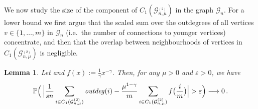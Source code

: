 \documentclass[12pt,a4paper]{article}
\numberwithin{equation}{section}
\newtheorem{lemma}[shared]{Lemma}
\begin{document}
We now study the size of the component 
of $C_1(\mathcal G_{n,\mu}^{_{(2)}})$ in the graph 
$\mathscr G_n$. For a lower bound we first argue that the scaled sum over the outdegrees of all vertices $v\in \{1,\ldots, m\}$ in $\mathscr G_n$ (i.e.\ the number of connections to younger vertices) concentrate, and then that the overlap between neighbourhoods of vertices in $C_1(\mathcal G_{n,\mu}^{_{(2)}})$ is negligible.

\begin{lemma}\label{nnc}
Let  and $f(x):=\tfrac{1}{\gamma}x^{-\gamma}$. Then,
for any $\mu>0$ and $\varepsilon>0$, we have 
    \begin{align*}
        \mathbb P \Big(\,\Big|\frac{1}{sn}\sum_{i\in C_1(\mathcal G_{n,\mu}^{_{(2)}})} \text{\emph{outdeg}}(i)-\frac{\mu^{1-\gamma}}{m}\sum_{i\in C_1(\mathcal G_{n,\mu}^{_{(2)}})}f\big(\frac{i}{m}\big) \Big|> \varepsilon \Big) \longrightarrow 0 \,.
    \end{align*}
\end{lemma}
\end{document}

